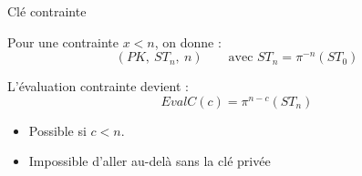 \documentclass{beamer}
\begin{document}

\begin{frame}{Clé contrainte}

Pour une contrainte \(x < n\), on donne :
\[
(PK,\ ST_n,\ n) \qquad \text{avec } ST_n = \pi^{-n}(ST_0)
\]

L'évaluation contrainte devient :
\[
\mathit{EvalC}(c) = \pi^{n-c}(ST_n)
\]

\begin{itemize}
    \item Possible si \(c < n\).
    \item Impossible d'aller au-delà sans la clé privée
\end{itemize}

\end{frame}
\end{document}
